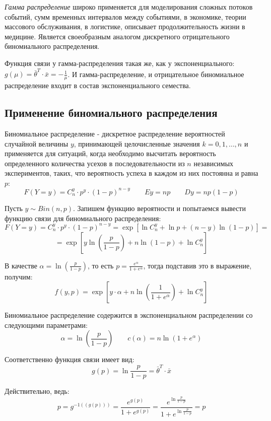 \documentclass[aps,%
12pt,%
final,%
oneside,
onecolumn,%
musixtex, %
superscriptaddress,%
centertags]{article} %
\theoremstyle{plain}
\theoremstyle{definition}
\theoremstyle{remark}
\begin{document}
\textit{Гамма распределение} широко применяется для моделирования сложных потоков событий, сумм временных интервалов между событиями, в экономике, теории массового обслуживания, в логистике, описывает продолжительность жизни в медицине. Является своеобразным аналогом дискретного отрицательного биномиального распределения.

Функция связи у гамма-распределения такая же, как у экспоненциального: $g(\mu) = \left .\bar{\theta}\right .^T \cdot \bar{x} = - \frac{1}{\mu}$. И гамма-распределение, и отрицательное биномиальное распределение входит в состав экспоненциального семества.


\newpage
\subsection{Применение биномиального распределения}

Биномиальное распределение - дискретное распределение вероятностей случайной величины $y$, принимающей целочисленные значения $k=0,1,\ldots,n$ и применяется для ситуаций, когда необходимо высчитать вероятность определенного количества усехов в последовательности из $n$ независимых экспериментов, таких, что вероятность успеха в каждом из них постоянна и равна $p$:
$$F(Y = y) = C_n^y \cdot p^y \cdot (1-p)^{n-y} \qquad Ey = np \qquad Dy = np(1-p)$$ 

Пусть $y \sim Bin(n,p)$. Запишем функцию вероятности и попытаемся вывести функцию связи для биномиального распределения:
$$F(Y = y) = C_n^y \cdot p^y \cdot (1-p)^{n-y} = \exp \left[\ln C_n^y + \ln p + (n-y) \ln (1-p)\right] = $$
$$ = \exp\left[y\ln\left(\frac{p}{1-p}\right) + n \ln (1-p) + \ln C_n^y \right]$$

В качестве $\alpha = \ln\left(\frac{p}{1-p}\right)$, то есть $p = \frac{e^{\alpha}}{1+e^{\alpha}}$, тогда подставив это в выражение, получим:
$$f(y,p) =\exp\left[y\cdot \alpha + n \ln \left(\frac{1}{1+e^{\alpha}}\right) + \ln C_n^y\right]$$

Биномиальное распределение содержится в экспоненциальном распределении со следующими параметрами:
$$\alpha = \ln\left(\frac{p}{1-p}\right) \qquad c(\alpha) = n \ln (1+e^{\alpha})$$

Соответственно функция связи имеет вид:
$$g(p) = \ln \frac{p}{1-p} = \left .\bar{\theta}\right .^T \cdot \bar{x} $$

Действительно, ведь:
$$p = g^{-1((g(p)))} = \frac{e^{g(p)}}{1+e^{g(p)}} = \frac{e^{\ln \frac{p}{1-p}}}{1+e^{\ln \frac{p}{1-p}}}  = p$$
\end{document}
